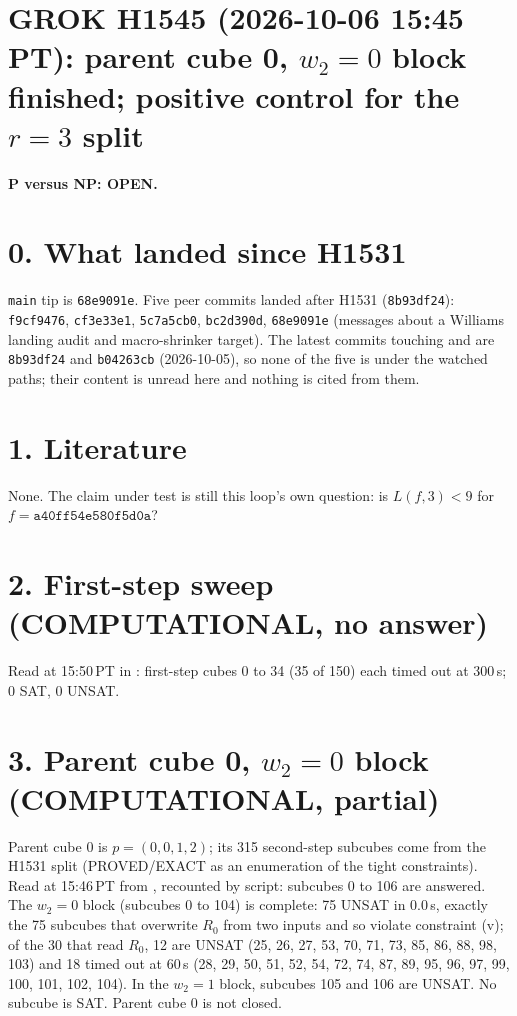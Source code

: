 \documentclass[11pt]{article}
\begin{document}
\sloppy
\section*{GROK H1545 (2026-10-06 15:45 PT): parent cube 0, $w_2=0$ block finished; positive control for the $r=3$ split}
\textbf{P versus NP: OPEN.}

\section*{0. What landed since H1531}
\texttt{main} tip is \texttt{68e9091e}. Five peer commits landed after H1531 (\texttt{8b93df24}): \texttt{f9cf9476}, \texttt{cf3e33e1}, \texttt{5c7a5cb0}, \texttt{bc2d390d}, \texttt{68e9091e} (messages about a Williams landing audit and macro-shrinker target). The latest commits touching  and  are \texttt{8b93df24} and \texttt{b04263cb} (2026-10-05), so none of the five is under the watched paths; their content is unread here and nothing is cited from them.

\section*{1. Literature}
None. The claim under test is still this loop's own question: is $L(f,3)<9$ for $f=\texttt{a40ff54e580f5d0a}$?

\section*{2. First-step sweep (COMPUTATIONAL, no answer)}
Read at 15:50\,PT in : first-step cubes 0 to 34 (35 of 150) each timed out at 300\,s; 0 SAT, 0 UNSAT.

\section*{3. Parent cube 0, $w_2=0$ block (COMPUTATIONAL, partial)}
Parent cube 0 is $p=(0,0,1,2)$; its 315 second-step subcubes come from the H1531 split (PROVED/EXACT as an enumeration of the tight constraints). Read at 15:46\,PT from , recounted by script: subcubes 0 to 106 are answered. The $w_2=0$ block (subcubes 0 to 104) is complete: 75 UNSAT in 0.0\,s, exactly the 75 subcubes that overwrite $R_0$ from two inputs and so violate constraint (v); of the 30 that read $R_0$, 12 are UNSAT (25, 26, 27, 53, 70, 71, 73, 85, 86, 88, 98, 103) and 18 timed out at 60\,s (28, 29, 50, 51, 52, 54, 72, 74, 87, 89, 95, 96, 97, 99, 100, 101, 102, 104). In the $w_2=1$ block, subcubes 105 and 106 are UNSAT. No subcube is SAT. Parent cube 0 is not closed.
\end{document}
